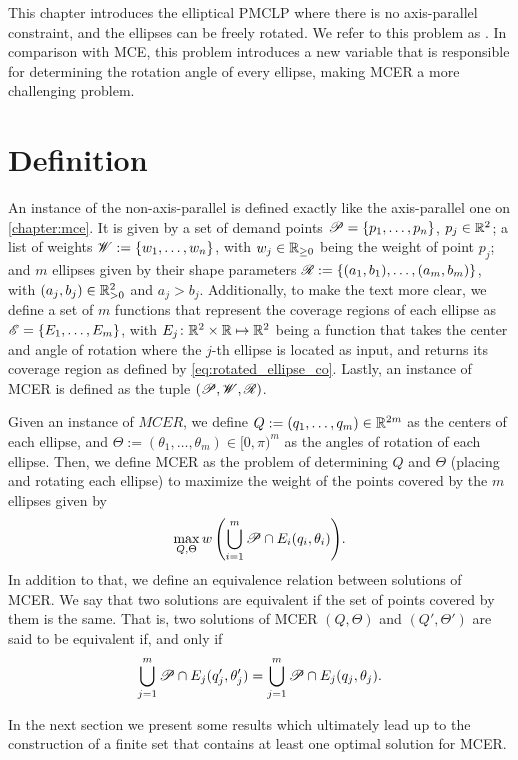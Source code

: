 This chapter introduces the elliptical PMCLP where there is no axis-parallel constraint, and the ellipses can be freely rotated. We refer to this problem as . In comparison with MCE, this problem introduces a new variable that is responsible for determining the rotation angle of every ellipse, making MCER a more challenging problem.

\section{Definition}

An instance of the non-axis-parallel is defined exactly like the axis-parallel one on \autoref{chapter:mce}. It is given by a set of demand points $\mathscr{P}=\{p_1, \dots, p_n\}$, $p_j\in\mathbb{R}^2$; a list of weights $\mathscr{W}:=\{w_1, \dots, w_n\}$, with $w_j\in\mathbb{R}_{\ge0}$ being the weight of point $p_j$;
and $m$ ellipses given by their shape parameters $\mathscr{R}:=\{(a_1, b_1), \dots, (a_m, b_m)\}$, with $(a_j, b_j)\in\mathbb{R}_{>0}^2$ and $a_j>b_j$.
Additionally, to make the text more clear, we define a set of $m$ functions that represent the coverage regions of each ellipse as $\mathscr{E} = \{E_1, \dots, E_m\}$, with $E_j\colon \mathbb{R}^2\times\mathbb{R} \mapsto \mathbb{R}^2$ being a function that takes the center and angle of rotation where the $j$-th ellipse is located as input, and returns its coverage region as defined by \autoref{eq:rotated_ellipse_co}.
Lastly, an instance of MCER is defined as the tuple $(\mathscr{P}, \mathscr{W}, \mathscr{R})$.

Given an instance of $MCER$, we define $Q:=(q_1, \dots, q_m) \in \mathbb{R}^{2m}$ as the centers of each ellipse, and $\Theta:=(\theta_1, \dots, \theta_m) \in [0, \pi)^m$ as the angles of rotation of each ellipse. Then, we define MCER as the problem of determining $Q$ and $\Theta$ (placing and rotating each ellipse) to maximize the weight of the points covered by the $m$ ellipses given by
\begin{equation}\label{eq:optMCEn}
\max_{Q, \Theta}{w\left(\bigcup_{i=1}^{m} \mathscr{P} \cap E_i(q_i, \theta_i)\right)}.
\end{equation}
In addition to that, we define an equivalence relation between solutions of MCER. We say that two solutions are equivalent if the set of points covered by them is the same. That is, two solutions of MCER $(Q, \Theta)$ and $(Q', \Theta')$ are said to be equivalent if, and only if 
$$\bigcup_{j=1}^m\mathscr{P} \cap E_j(q_j', \theta_j') = \bigcup_{j=1}^m\mathscr{P} \cap E_j(q_j, \theta_j).$$

In the next section we present some results which ultimately lead up to the construction of a finite set that contains at least one optimal solution for MCER.

